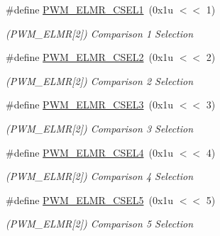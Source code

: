 \begin{DoxyCompactItemize}
\mbox{\label{group__SAMV71__PWM_ga08f6b7258c6bc91e429811ccd14a8310}} 
\#define \mbox{\hyperlink{group__SAMV71__PWM_ga08f6b7258c6bc91e429811ccd14a8310}{P\+W\+M\+\_\+\+E\+L\+M\+R\+\_\+\+C\+S\+E\+L1}}~(0x1u $<$$<$ 1)
\begin{DoxyCompactList}\small\item\em (P\+W\+M\+\_\+\+E\+L\+MR\mbox{[}2\mbox{]}) Comparison 1 Selection \end{DoxyCompactList}\item 
\mbox{\label{group__SAMV71__PWM_gabec0c8acd271024f3e167e644a3d2d27}} 
\#define \mbox{\hyperlink{group__SAMV71__PWM_gabec0c8acd271024f3e167e644a3d2d27}{P\+W\+M\+\_\+\+E\+L\+M\+R\+\_\+\+C\+S\+E\+L2}}~(0x1u $<$$<$ 2)
\begin{DoxyCompactList}\small\item\em (P\+W\+M\+\_\+\+E\+L\+MR\mbox{[}2\mbox{]}) Comparison 2 Selection \end{DoxyCompactList}\item 
\mbox{\label{group__SAMV71__PWM_ga02f65ca00c0fbbfe5b44af28f6a73f63}} 
\#define \mbox{\hyperlink{group__SAMV71__PWM_ga02f65ca00c0fbbfe5b44af28f6a73f63}{P\+W\+M\+\_\+\+E\+L\+M\+R\+\_\+\+C\+S\+E\+L3}}~(0x1u $<$$<$ 3)
\begin{DoxyCompactList}\small\item\em (P\+W\+M\+\_\+\+E\+L\+MR\mbox{[}2\mbox{]}) Comparison 3 Selection \end{DoxyCompactList}\item 
\mbox{\label{group__SAMV71__PWM_ga5c0348a9525eb00101b564a982be4c8d}} 
\#define \mbox{\hyperlink{group__SAMV71__PWM_ga5c0348a9525eb00101b564a982be4c8d}{P\+W\+M\+\_\+\+E\+L\+M\+R\+\_\+\+C\+S\+E\+L4}}~(0x1u $<$$<$ 4)
\begin{DoxyCompactList}\small\item\em (P\+W\+M\+\_\+\+E\+L\+MR\mbox{[}2\mbox{]}) Comparison 4 Selection \end{DoxyCompactList}\item 
\mbox{\label{group__SAMV71__PWM_gafa8d31d1dfabab5ddc3c1d025f1e49a1}} 
\#define \mbox{\hyperlink{group__SAMV71__PWM_gafa8d31d1dfabab5ddc3c1d025f1e49a1}{P\+W\+M\+\_\+\+E\+L\+M\+R\+\_\+\+C\+S\+E\+L5}}~(0x1u $<$$<$ 5)
\begin{DoxyCompactList}\small\item\em (P\+W\+M\+\_\+\+E\+L\+MR\mbox{[}2\mbox{]}) Comparison 5 Selection \end{DoxyCompactList}\item 
$$
\end{DoxyCompactItemize}
